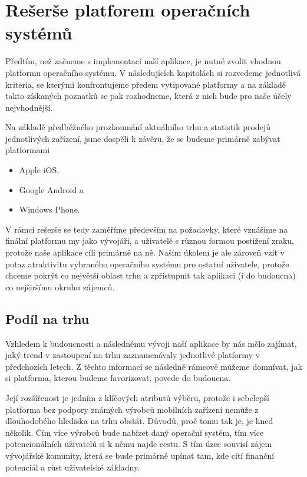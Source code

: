 \documentclass[thesis=M,czech]{FITthesis}[2012/06/26]
\begin{document}
\section{Rešerše platforem operačních systémů}
Předtím, než začneme s implementací naší aplikace, je nutné zvolit vhodnou platformu operačního systému. V následujících kapitolách si rozvedeme jednotlivá kriteria, se kterými konfrontujeme předem vytipované platformy a na základě takto získaných poznatků se pak rozhodneme, která z nich bude pro naše účely nejvhodnější.

Na základě předběžného prozkoumání aktuálního trhu a statistik prodejů jednotlivých zařízení, jsme dospěli k závěru, že se budeme primárně zabývat platformami

\begin{itemize}
\item    Apple iOS,
\item    Google Android a
\item    Windows Phone.
\end{itemize}

V rámci rešerše se tedy zaměříme především na požadavky, které vznášíme na finální platformu my jako vývojáři, a uživatelé s různou formou postižení zraku, protože naše aplikace cílí primárně na ně. Naším úkolem je ale zároveň vzít v potaz atraktivitu vybraného operačního systému pro ostatní uživatele, protože chceme pokrýt co největší oblast trhu a zpřístupnit tak aplikaci (i do budoucna) co nejširšímu okruhu zájemců.

\subsection{Podíl na trhu}
Vzhledem k budoucnosti a následnému vývoji naší aplikace by nás mělo zajímat, jaký trend v zastoupení na trhu zaznamenávaly jednotlivé platformy v předchozích letech. Z těchto informací se následně rámcově můžeme domnívat, jak si platforma, kterou budeme favorizovat, povede do budoucna.

Její rozšířenost je jedním z klíčových atributů výběru, protože i sebelepší platforma bez podpory známých výrobců mobilních zařízení nemůže z dlouhodobého hlediska na trhu obstát. Důvodů, proč tomu tak je, je hned několik. Čím více výrobců bude nabízet daný operační systém, tím více potencionálních uživatelů si k němu najde cestu. S tím úzce souvisí zájem vývojářské komunity, která se bude primárně upínat tam, kde cítí finanční potenciál a růst uživatelské základny.
\end{document}
